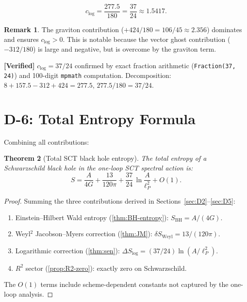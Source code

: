 \documentclass[11pt,a4paper]{article}
\newcommand{\lP}{\ell_P}
\theoremstyle{plain}
\newtheorem{theorem}{Theorem}[section]
\theoremstyle{definition}
\newtheorem{remark}[theorem]{Remark}
\newcommand{\verified}[1]{%
  \par\smallskip\noindent
  \colorbox{green!10}{\parbox{\dimexpr\linewidth-2\fboxsep}{%
    \textcolor{green!50!black}{\textbf{[Verified]}} #1}}%
  \par\smallskip}
\begin{document}
\begin{equation}\label{eq:clog-value}
  \boxed{c_{\log} = \frac{277.5}{180} = \frac{37}{24} \approx 1.5417.}
\end{equation}

\begin{remark}
The graviton contribution ($+424/180 = 106/45 \approx 2.356$) dominates
and ensures $c_{\log} > 0$. This is notable because the vector ghost
contribution ($-312/180$) is large and negative, but is overcome by the
graviton term.
\end{remark}

\verified{$c_{\log} = 37/24$ confirmed by exact fraction arithmetic
(\texttt{Fraction(37, 24)}) and 100-digit \texttt{mpmath} computation.
Decomposition: $8 + 157.5 - 312 + 424 = 277.5$, $277.5/180 = 37/24$.}


\section{D-6: Total Entropy Formula}
\label{sec:D6}

Combining all contributions:

\begin{theorem}[Total SCT black hole entropy]\label{thm:total-entropy}
The total entropy of a Schwarzschild black hole in the one-loop SCT
spectral action is:
\begin{equation}\label{eq:S-total}
  \boxed{S = \frac{A}{4G} + \frac{13}{120\pi}
  + \frac{37}{24}\,\ln\frac{A}{\lP^2} + O(1).}
\end{equation}
\end{theorem}

\begin{proof}
Summing the three contributions derived in Sections~\ref{sec:D2}--\ref{sec:D5}:
\begin{enumerate}[nosep]
  \item Einstein--Hilbert Wald entropy (\cref{thm:BH-entropy}):
        $S_{\mathrm{BH}} = A/(4G)$.
  \item Weyl${}^2$ Jacobson--Myers correction (\cref{thm:JM}):
        $\delta S_{\mathrm{Weyl}} = 13/(120\pi)$.
  \item Logarithmic correction (\cref{thm:sen}):
        $\Delta S_{\log} = (37/24)\ln(A/\lP^2)$.
  \item $R^2$ sector (\cref{prop:R2-zero}): exactly zero on Schwarzschild.
\end{enumerate}
The $O(1)$ terms include scheme-dependent constants not captured by
the one-loop analysis.
\end{proof}
\end{document}
